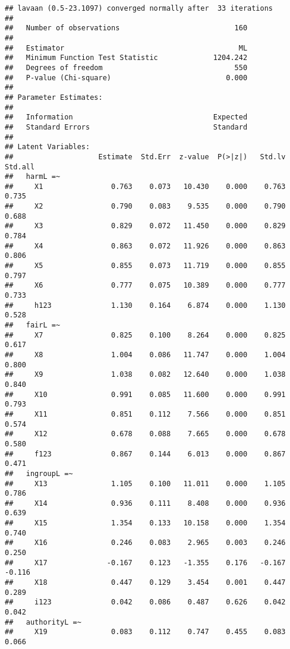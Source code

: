 \documentclass[english,man]{apa6}
\newcounter{author}
\theoremstyle{definition}
\theoremstyle{definition}
\theoremstyle{definition}
\theoremstyle{remark}
\begin{document}
\begin{verbatim}
## lavaan (0.5-23.1097) converged normally after  33 iterations
## 
##   Number of observations                           160
## 
##   Estimator                                         ML
##   Minimum Function Test Statistic             1204.242
##   Degrees of freedom                               550
##   P-value (Chi-square)                           0.000
## 
## Parameter Estimates:
## 
##   Information                                 Expected
##   Standard Errors                             Standard
## 
## Latent Variables:
##                    Estimate  Std.Err  z-value  P(>|z|)   Std.lv  Std.all
##   harmL =~                                                              
##     X1                0.763    0.073   10.430    0.000    0.763    0.735
##     X2                0.790    0.083    9.535    0.000    0.790    0.688
##     X3                0.829    0.072   11.450    0.000    0.829    0.784
##     X4                0.863    0.072   11.926    0.000    0.863    0.806
##     X5                0.855    0.073   11.719    0.000    0.855    0.797
##     X6                0.777    0.075   10.389    0.000    0.777    0.733
##     h123              1.130    0.164    6.874    0.000    1.130    0.528
##   fairL =~                                                              
##     X7                0.825    0.100    8.264    0.000    0.825    0.617
##     X8                1.004    0.086   11.747    0.000    1.004    0.800
##     X9                1.038    0.082   12.640    0.000    1.038    0.840
##     X10               0.991    0.085   11.600    0.000    0.991    0.793
##     X11               0.851    0.112    7.566    0.000    0.851    0.574
##     X12               0.678    0.088    7.665    0.000    0.678    0.580
##     f123              0.867    0.144    6.013    0.000    0.867    0.471
##   ingroupL =~                                                           
##     X13               1.105    0.100   11.011    0.000    1.105    0.786
##     X14               0.936    0.111    8.408    0.000    0.936    0.639
##     X15               1.354    0.133   10.158    0.000    1.354    0.740
##     X16               0.246    0.083    2.965    0.003    0.246    0.250
##     X17              -0.167    0.123   -1.355    0.176   -0.167   -0.116
##     X18               0.447    0.129    3.454    0.001    0.447    0.289
##     i123              0.042    0.086    0.487    0.626    0.042    0.042
##   authorityL =~                                                         
##     X19               0.083    0.112    0.747    0.455    0.083    0.066

\end{verbatim}
\end{document}
